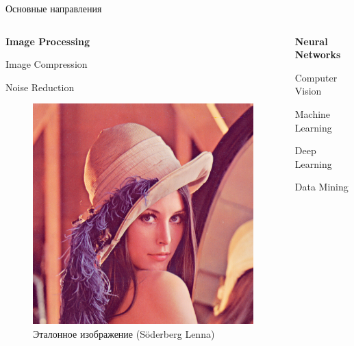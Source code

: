 \documentclass{beamer}
\begin{document}
	\begin{frame}{Основные направления}
		
		\begin{columns}
			\begin{column}{0.3\textwidth}
				
				\textbf{Image Processing}
				
				Image Compression
				
				Noise Reduction
				\begin{figure}
				\includegraphics[width=\textwidth]{images/Lenna_test_image.png}
				\caption{Эталонное изображение (Söderberg Lenna)}
				\end{figure}
				
			\end{column}


			\begin{column}{0.3\textwidth}
				
				\textbf{Neural Networks}

				Computer Vision
				
				Machine Learning
				
				Deep Learning
				
				Data Mining				

				\vspace{2.5mm}


\end{column}
\end{columns}
\end{frame}
\end{document}
